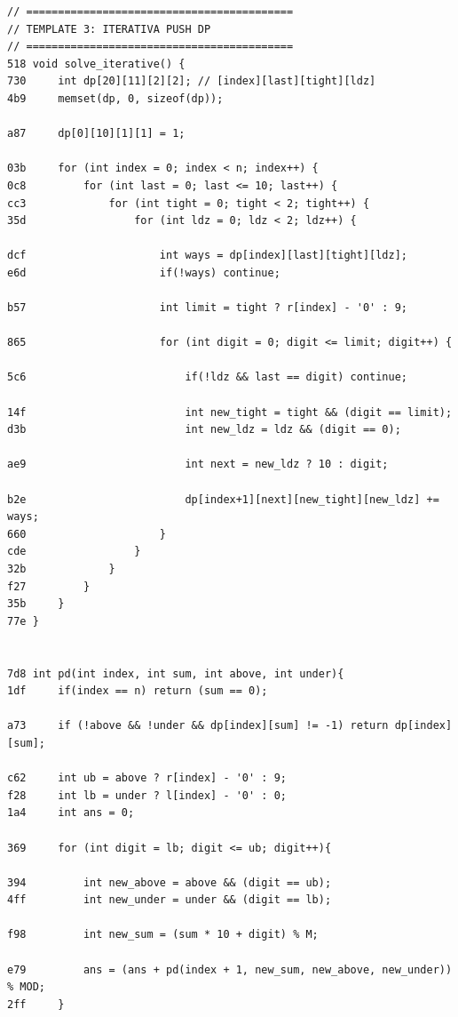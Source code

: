 \documentclass[11pt, a4paper, twoside]{article}
\begin{document}
\begin{lstlisting}
// ==========================================
// TEMPLATE 3: ITERATIVA PUSH DP
// ==========================================
518 void solve_iterative() {
730     int dp[20][11][2][2]; // [index][last][tight][ldz]
4b9     memset(dp, 0, sizeof(dp));
    
a87     dp[0][10][1][1] = 1;
    
03b     for (int index = 0; index < n; index++) {
0c8         for (int last = 0; last <= 10; last++) {
cc3             for (int tight = 0; tight < 2; tight++) {
35d                 for (int ldz = 0; ldz < 2; ldz++) {
                        
dcf                     int ways = dp[index][last][tight][ldz];
e6d                     if(!ways) continue;
    
b57                     int limit = tight ? r[index] - '0' : 9;
                        
865                     for (int digit = 0; digit <= limit; digit++) {
                            
5c6                         if(!ldz && last == digit) continue;
    
14f                         int new_tight = tight && (digit == limit);
d3b                         int new_ldz = ldz && (digit == 0);
                            
ae9                         int next = new_ldz ? 10 : digit;
    
b2e                         dp[index+1][next][new_tight][new_ldz] += ways;
660                     }
cde                 }
32b             }
f27         }
35b     }
77e }


7d8 int pd(int index, int sum, int above, int under){
1df     if(index == n) return (sum == 0);
    
a73     if (!above && !under && dp[index][sum] != -1) return dp[index][sum];
    
c62     int ub = above ? r[index] - '0' : 9;
f28     int lb = under ? l[index] - '0' : 0;
1a4     int ans = 0;
    
369     for (int digit = lb; digit <= ub; digit++){
    
394         int new_above = above && (digit == ub);
4ff         int new_under = under && (digit == lb);
            
f98         int new_sum = (sum * 10 + digit) % M;
            
e79         ans = (ans + pd(index + 1, new_sum, new_above, new_under)) % MOD;
2ff     }
        

\end{lstlisting}
\end{document}
